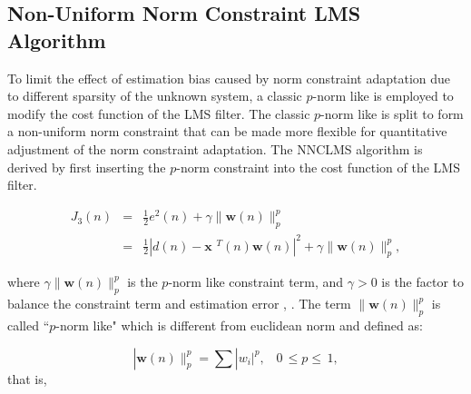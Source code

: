 \vspace{-0.3cm}
\subsection{Non-Uniform Norm Constraint LMS Algorithm}\label{sec:3.6.3}
\vspace{-0.5cm}
\noindent To limit the effect of estimation bias caused by norm constraint adaptation due to different sparsity of the unknown system, a classic $p$-norm like is employed to modify the cost function of the LMS filter. The classic $p$-norm like is split to form a non-uniform norm constraint that can be made more flexible for quantitative adjustment of the norm constraint adaptation. The NNCLMS algorithm is derived by first inserting the $p$-norm  constraint into the cost function of the LMS filter.

\vspace{-1.5cm}
\begin{eqnarray}
J_{3}(n)&=&\frac{1}{2}e^2(n)+\gamma\|\textbf{w}(n)\|_p^p\\
                 &=&\frac{1}{2}|d(n)-\textbf{x }^{T}(n)\textbf{w}(n)|^{2} + \gamma\|\textbf{w}(n)\|_p^p, \label{eq21b}
 \end{eqnarray}

\noindent where $\gamma\|\textbf{w}(n)\|_p^p$ is the $p$-norm like constraint term, and $\gamma>0$ is the factor to balance the constraint term and estimation error \cite{chart}, \cite{rao}. The term $\|\textbf{w}(n)\|_p^p$ is called ``$p$-norm like" which is different from euclidean norm and defined as:

\vspace{-0.6cm}
\begin{equation}
|\textbf{w}(n)\|_p^p=\sum|w_i|^p, \hspace{10pt}0\hspace{2pt}\leq p\leq\hspace{2pt}1, \label{eq22b}
\end{equation}
\vspace{-0.6cm}
\noindent that is,

